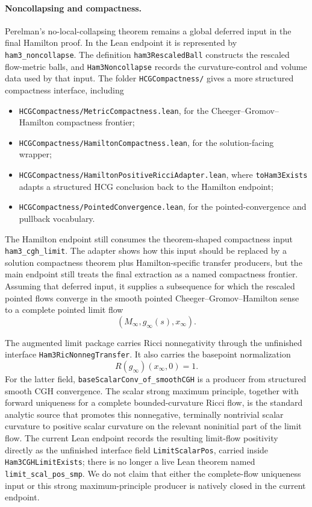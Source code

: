\documentclass[11pt]{article}
\theoremstyle{plain}
\theoremstyle{definition}
\theoremstyle{remark}
\newcommand{\leanref}[1]{\nolinkurl{#1}}
\newcommand{\leanfile}[1]{\nolinkurl{#1}}
\newcommand{\rffile}[1]{\leanfile{#1}}
\newcommand{\rfdir}[1]{\leanfile{#1/}}
\begin{document}
\paragraph{Noncollapsing and compactness.}
Perelman's no-local-collapsing theorem remains a global deferred input in the final
Hamilton proof.  In the Lean endpoint it is represented by
\leanref{ham3_noncollapse}.  The definition \leanref{ham3RescaledBall} constructs
the rescaled flow-metric balls, and \leanref{Ham3Noncollapse} records the
curvature-control and volume data used by that input.
The folder \rfdir{HCGCompactness} gives a more structured compactness
interface, including
\begin{itemize}[leftmargin=2em]
  \item \rffile{HCGCompactness/MetricCompactness.lean}, for the Cheeger--Gromov--Hamilton compactness
    frontier;
  \item \rffile{HCGCompactness/HamiltonCompactness.lean}, for the solution-facing wrapper;
  \item \rffile{HCGCompactness/HamiltonPositiveRicciAdapter.lean}, where
    \leanref{toHam3Exists} adapts a structured HCG conclusion back to the
    Hamilton endpoint;
  \item \rffile{HCGCompactness/PointedConvergence.lean}, for the pointed-convergence and
    pullback vocabulary.
\end{itemize}
The Hamilton endpoint still consumes the theorem-shaped compactness input
\leanref{ham3_cgh_limit}.  The adapter shows how this input should be replaced
by a solution compactness theorem plus Hamilton-specific transfer producers,
but the main endpoint still treats the final extraction as a named compactness
frontier.  Assuming that deferred input, it supplies a subsequence for which
the rescaled pointed flows converge in the smooth pointed
Cheeger--Gromov--Hamilton sense to a complete pointed limit flow
\[
(M_\infty,g_\infty(s),x_\infty).
\]

The augmented limit package carries Ricci nonnegativity through the unfinished
interface \leanref{Ham3RicNonnegTransfer}.  It also carries the basepoint
normalization
\[
R(g_\infty)(x_\infty,0)=1.
\]
For the latter field, \leanref{baseScalarConv_of_smoothCGH} is a producer from
structured smooth CGH
convergence.
The scalar strong maximum principle, together with forward uniqueness for a
complete bounded-curvature Ricci flow, is the standard analytic source that
promotes this nonnegative, terminally nontrivial scalar curvature to positive
scalar curvature on the relevant noninitial part of the limit flow.  The
current Lean endpoint records the resulting limit-flow positivity directly as
the unfinished interface field \leanref{LimitScalarPos}, carried inside
\leanref{Ham3CGHLimitExists}; there is
no longer a live Lean theorem named \texttt{limit\_scal\_pos\_smp}.  We do not
claim that either the complete-flow uniqueness input or this strong
maximum-principle producer is natively closed in the current endpoint.
\end{document}
